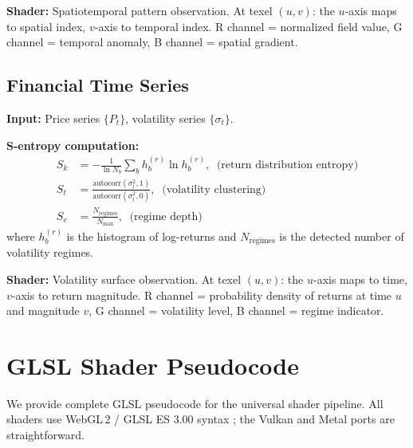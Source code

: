 \documentclass[11pt,twocolumn,a4paper]{article}
\newcommand{\Sk}{S_k}
\newcommand{\St}{S_t}
\newcommand{\Se}{S_e}
\begin{document}
\textbf{Shader:} Spatiotemporal pattern observation. At texel $(u,v)$:
the $u$-axis maps to spatial index, $v$-axis to temporal index.
R channel = normalized field value, G channel = temporal anomaly,
B channel = spatial gradient.

\subsection{Financial Time Series}
\label{sec:financial}

\textbf{Input:} Price series $\{P_t\}$, volatility series
$\{\sigma_t\}$.

\textbf{S-entropy computation:}
\begin{align}
\Sk &= -\frac{1}{\ln N_b}
  \sum_b h_b^{(r)} \ln h_b^{(r)},
  \;\;\text{(return distribution entropy)}
\label{eq:fin-Sk} \\
\St &= \frac{\text{autocorr}(\sigma_t^2, 1)}
  {\text{autocorr}(\sigma_t^2, 0)},
  \;\;\text{(volatility clustering)}
\label{eq:fin-St} \\
\Se &= \frac{N_{\mathrm{regimes}}}{N_{\max}},
  \;\;\text{(regime depth)}
\label{eq:fin-Se}
\end{align}
where $h_b^{(r)}$ is the histogram of log-returns and
$N_{\mathrm{regimes}}$ is the detected number of volatility
regimes.

\textbf{Shader:} Volatility surface observation. At texel $(u,v)$:
the $u$-axis maps to time, $v$-axis to return magnitude. R channel
= probability density of returns at time $u$ and magnitude $v$,
G channel = volatility level, B channel = regime indicator.



\section{GLSL Shader Pseudocode}
\label{sec:glsl}

We provide complete GLSL pseudocode for the universal shader pipeline.
All shaders use WebGL\,2 / GLSL ES 3.00 syntax
\citep{khronoswebgl2,khronosglsl}; the Vulkan \citep{khronosvulkan}
and Metal \citep{applemetal} ports are straightforward.
\end{document}
